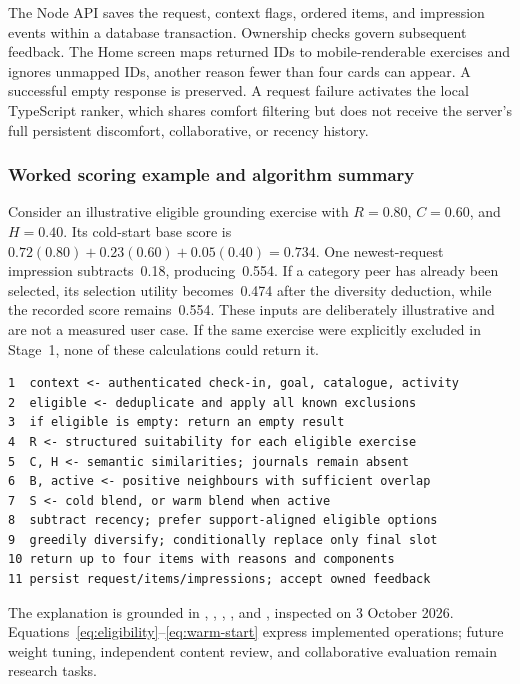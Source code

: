 The Node API saves the request, context flags, ordered items, and impression events within a database transaction. Ownership checks govern subsequent feedback. The Home screen maps returned IDs to mobile-renderable exercises and ignores unmapped IDs, another reason fewer than four cards can appear. A successful empty response is preserved. A request failure activates the local TypeScript ranker, which shares comfort filtering but does not receive the server's full persistent discomfort, collaborative, or recency history.

\subsubsection{Worked scoring example and algorithm summary}
\label{sec:worked-recommendation}

Consider an illustrative eligible grounding exercise with $R=0.80$, $C=0.60$, and $H=0.40$. Its cold-start base score is $0.72(0.80)+0.23(0.60)+0.05(0.40)=0.734$. One newest-request impression subtracts~0.18, producing~0.554. If a category peer has already been selected, its selection utility becomes~0.474 after the diversity deduction, while the recorded score remains~0.554. These inputs are deliberately illustrative and are not a measured user case. If the same exercise were explicitly excluded in Stage~1, none of these calculations could return it.

\begin{lstlisting}[caption={Five-stage algorithm summary. Operational logging and ownership checks occur in the API around this ranker.},label={lst:five-stage-algorithm}]
1  context <- authenticated check-in, goal, catalogue, activity
2  eligible <- deduplicate and apply all known exclusions
3  if eligible is empty: return an empty result
4  R <- structured suitability for each eligible exercise
5  C, H <- semantic similarities; journals remain absent
6  B, active <- positive neighbours with sufficient overlap
7  S <- cold blend, or warm blend when active
8  subtract recency; prefer support-aligned eligible options
9  greedily diversify; conditionally replace only final slot
10 return up to four items with reasons and components
11 persist request/items/impressions; accept owned feedback
\end{lstlisting}

The explanation is grounded in , , , , and , inspected on 3 October 2026. Equations~\ref{eq:eligibility}--\ref{eq:warm-start} express implemented operations; future weight tuning, independent content review, and collaborative evaluation remain research tasks.


